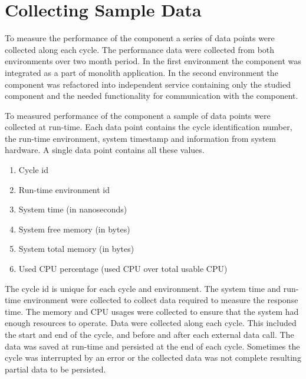 \section{Collecting Sample Data}
To measure the performance of the component a series of data points were collected along each cycle.
The performance data were collected from both environments over two month period.
In the first environment the component was integrated as a part of monolith application.
In the second environment the component was refactored into independent service containing only the studied component and the needed functionality for communication with the component.

To measured performance of the component a sample of data points were collected at run-time.
Each data point contains the cycle identification number, the run-time environment, system timestamp and information from system hardware.
A single data point contains all these values.
\begin{enumerate}
    \item Cycle id
    \item Run-time environment id
    \item System time (in nanoseconds)
    \item System free memory (in bytes)
    \item System total memory (in bytes)
    \item Used CPU percentage (used CPU over total usable CPU)
\end{enumerate}

The cycle id is unique for each cycle and environment.
The system time and run-time environment were collected to collect data required to measure the response time.
The memory and CPU usages were collected to ensure that the system had enough resources to operate.
Data were collected along each cycle.
This included the start and end of the cycle, and before and after each external data call.
The data was saved at run-time and persisted at the end of each cycle.
Sometimes the cycle was interrupted by an error or the collected data was not complete resulting partial data to be persisted.
